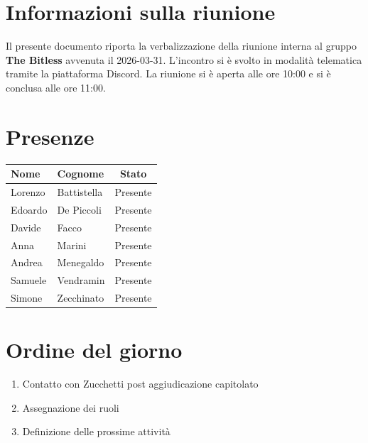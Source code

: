 \documentclass[a4paper, 10pt, colorlinks=true, linkcolor=black, urlcolor=blue, citecolor=blue, hidelinks]{article}
\begin{document}
\newcommand{\titolo}{Verbale interno}
\newcommand{\dataverbale}{2026-03-31}
\newcommand{\dataversione}{2026-04-03}
\newcommand{\versione}{1.0.0}
\newcommand{\stato}{Approvato}
\newcommand{\destinatari}{The Bitless, prof. Tullio Vardanega, prof. Riccardo Cardin}

\begin{titlepage}

\end{titlepage}

\newpage
\tableofcontents 

\newpage
\section{Informazioni sulla riunione}
Il presente documento riporta la verbalizzazione della riunione interna al gruppo \textbf{The Bitless} avvenuta il \dataverbale{}. L'incontro si è svolto in modalità telematica tramite la piattaforma Discord. La riunione si è aperta alle ore 10:00 e si è conclusa alle ore 11:00.

\section{Presenze}
\begin{center}
\begin{tabular}{|l|l|c|}
\hline
\textbf{Nome} & \textbf{Cognome} & \textbf{Stato} \\
\hline
Lorenzo & Battistella & Presente \\
Edoardo & De Piccoli & Presente \\
Davide & Facco & Presente \\
Anna & Marini & Presente \\
Andrea & Menegaldo & Presente \\
Samuele & Vendramin & Presente \\
Simone & Zecchinato & Presente \\
\hline
\end{tabular}
\end{center}

\section{Ordine del giorno}
\begin{enumerate}
    \item Contatto con Zucchetti post aggiudicazione capitolato
    \item Assegnazione dei ruoli
    \item Definizione delle prossime attività
\end{enumerate}
\end{document}
